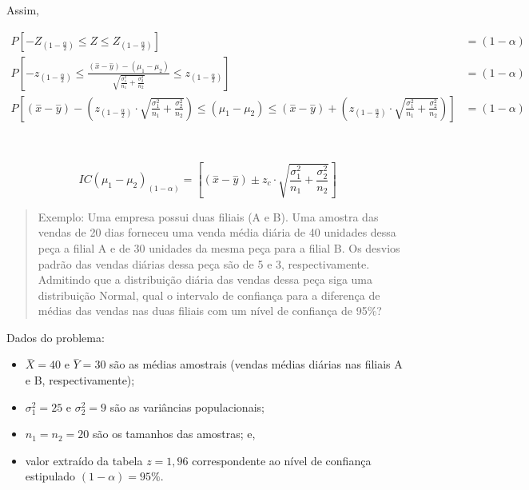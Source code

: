 \documentclass[
]{book}
\providecommand{\tightlist}{%
  \setlength{\itemsep}{0pt}\setlength{\parskip}{0pt}}
\begin{document}
\hfill\break

Assim,

\hfill\break

\begin{align*}
P\left[-{Z}_{(1-\frac{\alpha }{2})}\le Z \le {Z }_{(1-\frac{\alpha }{2})}\right] & = (1-\alpha) \\
P\left[-{z}_{(1-\frac{\alpha }{2})}\le    \frac{   (\stackrel{-}{x}-\stackrel{-}{y})   - (\mu_{1}-\mu_{2})}{ \sqrt{\frac{\sigma^{2}_{1}}{n_{1}} + \frac{\sigma^{2}_{2}}{n_{2}} }      }
\le {z}_{(1-\frac{\alpha }{2})}\right] & = (1-\alpha)  \\
P[(\stackrel{-}{x}-\stackrel{-}{y} ) -   ({z}_{(1-\frac{\alpha }{2})} \cdot  \sqrt{\frac{\sigma^{2}_{1}}{n_{1}} + \frac{\sigma^{2}_{2}}{n_{2}} }  ) \le (\mu_{1}-\mu_{2}) \le (\stackrel{-}{x}-\stackrel{-}{y})   +({z}_{(1-\frac{\alpha }{2})} \cdot    \sqrt{\frac{\sigma^{2}_{1}}{n_{1}} + \frac{\sigma^{2}_{2}}{n_{2}} }    )     ] & = (1-\alpha) 
\end{align*}

~

\[
IC(\mu_{1}-\mu_{2})_{(1-\alpha)}=[ (\stackrel{-}{x}-\stackrel{-}{y} ) \pm    {z}_{c} \cdot  \sqrt{\frac{\sigma^{2}_{1}}{n_{1}} + \frac{\sigma^{2}_{2}}{n_{2}} }   ] 
\]

\hfill\break

\begin{quote}
Exemplo: Uma empresa possui duas filiais (A e B). Uma amostra das vendas de 20 dias forneceu uma venda média diária de 40 unidades dessa peça a filial A e de 30 unidades da mesma peça para a filial B. Os desvios padrão das vendas diárias dessa peça são de 5 e 3, respectivamente. Admitindo que a distribuição diária das vendas dessa peça siga uma distribuição Normal, qual o intervalo de confiança para a diferença de médias das vendas nas duas filiais com um nível de confiança de 95\%?
\end{quote}

\hfill\break

Dados do problema:

\hfill\break

\begin{itemize}
\tightlist
\item
  \(\stackrel{-}{X}=40\) e \(\stackrel{-}{Y}=30\) são as médias amostrais (vendas médias diárias nas filiais A e B, respectivamente);\\
\item
  \(\sigma_{1}^{2}=25\) e \(\sigma_{2}^{2}=9\) são as variâncias populacionais;\\
\item
  \(n_{1} = n_{2}=20\) são os tamanhos das amostras; e,
\item
  valor extraído da tabela \(z=1,96\) correspondente ao nível de confiança estipulado \((1-\alpha)=95\%\).
\end{itemize}
\end{document}
